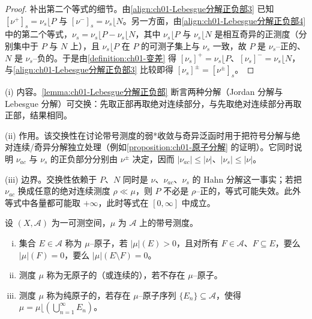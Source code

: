 \documentclass[../../main.tex]{subfiles}%
\begin{document}
\begin{proof}
补出第二个等式的细节。由\eqref{align:ch01-Lebesgue分解正负部3} 已知 $[\nu^+]_s=\nu_s\lfloor P$ 与 $[\nu^-]_s=\nu_s\lfloor N$。另一方面，由\eqref{align:ch01-Lebesgue分解正负部4} 中的第二个等式，$\nu_s=\nu_s\lfloor P-\nu_s\lfloor N$，其中 $\nu_s\lfloor P$ 与 $\nu_s\lfloor N$ 是相互奇异的正测度（分别集中于 $P$ 与 $N$ 上），且 $\nu_s\lfloor P$ 在 $P$ 的可测子集上与 $\nu_s$ 一致，故 $P$ 是 $\nu_s$--正的、$N$ 是 $\nu_s$--负的。于是由\cref{definition:ch01-变差} 得 $[\nu_s]^+=\nu_s\lfloor P$、$[\nu_s]^-=\nu_s\lfloor N$，与\eqref{align:ch01-Lebesgue分解正负部3} 比较即得 $[\nu_s]^\pm=[\nu^\pm]_s$。
\end{proof}

\begin{remark}\label{remark:ch01-Lebesgue分解正负部动机}
(i) 内容。\cref{lemma:ch01-Lebesgue分解正负部} 断言两种分解（Jordan 分解与 Lebesgue 分解）可交换：先取正部再取绝对连续部分，与先取绝对连续部分再取正部，结果相同。

(ii) 作用。该交换性在讨论带号测度的弱*收敛与奇异泛函时用于把符号分解与绝对连续/奇异分解独立处理（例如\cref{proposition:ch01-原子分解} 的证明）。它同时说明 $\nu_{ac}$ 与 $\nu_s$ 的正负部分分别由 $\nu^\pm$ 决定，因而 $|\nu_{ac}|\leqslant|\nu|$、$|\nu_s|\leqslant|\nu|$。

(iii) 边界。交换性依赖于 $P$、$N$ 同时是 $\nu$、$\nu_{ac}$、$\nu_s$ 的 Hahn 分解这一事实；若把 $\nu_{ac}$ 换成任意的绝对连续测度 $\rho\ll\mu$，则 $P$ 不必是 $\rho$--正的，等式可能失效。此外等式中各量都可能取 $+\infty$，此时等式在 $[0,\infty]$ 中成立。
\end{remark}

\begin{definition}\label{definition:ch01-原子}
设 $(X,\mathcal{A})$ 为一可测空间，$\mu$ 为 $\mathcal{A}$ 上的带号测度。
\begin{enumerate}[(i)]
\item 集合 $E\in\mathcal{A}$ 称为 $\mu$--原子，若 $|\mu|(E)>0$，且对所有 $F\in\mathcal{A}$、$F\subseteq E$，要么 $|\mu|(F)=0$，要么 $|\mu|(E\setminus F)=0$。
\item 测度 $\mu$ 称为无原子的（或连续的），若不存在 $\mu$--原子。
\item 测度 $\mu$ 称为纯原子的，若存在 $\mu$--原子序列 $\{E_n\}\subseteq\mathcal{A}$，使得 $\mu=\mu\lfloor\left(\bigcup_{n=1}^\infty E_n\right)$。
\end{enumerate}
\end{definition}
\end{document}
